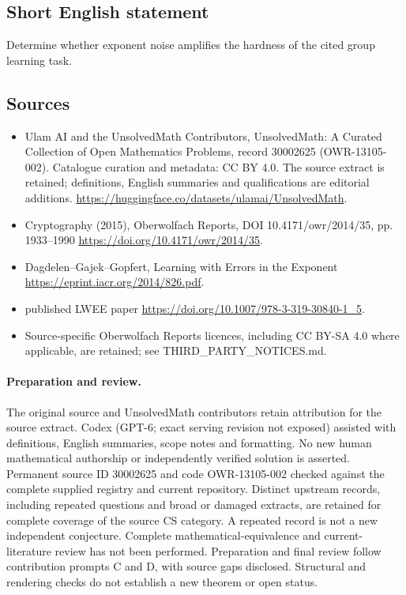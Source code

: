 \documentclass[11pt]{article}
\begin{document}
\subsection{Short English statement}
Determine whether exponent noise amplifies the hardness of the cited group learning task.
\subsection{Sources}
\begin{itemize}
\item[\hypertarget{source:30002625:1}{S1}] Ulam AI and the UnsolvedMath Contributors, UnsolvedMath: A Curated Collection of Open Mathematics Problems, record 30002625 (OWR-13105-002). Catalogue curation and metadata: CC BY 4.0. The source extract is retained; definitions, English summaries and qualifications are editorial additions.
\url{https://huggingface.co/datasets/ulamai/UnsolvedMath}.
\item[\hypertarget{source:30002625:2}{S2}] Cryptography (2015), Oberwolfach Reports, DOI 10.4171/owr/2014/35, pp. 1933--1990
\url{https://doi.org/10.4171/owr/2014/35}.
\item[\hypertarget{source:30002625:3}{S3}] Dagdelen--Gajek--Gopfert, Learning with Errors in the Exponent
\url{https://eprint.iacr.org/2014/826.pdf}.
\item[\hypertarget{source:30002625:4}{S4}] published LWEE paper
\url{https://doi.org/10.1007/978-3-319-30840-1_5}.
\item Source-specific Oberwolfach Reports licences, including CC BY-SA 4.0 where applicable, are retained; see THIRD\_PARTY\_NOTICES.md.
\end{itemize}
\paragraph{Preparation and review.}
The original source and UnsolvedMath contributors retain attribution for the source extract. Codex (GPT-6; exact serving revision not exposed) assisted with definitions, English summaries, scope notes and formatting. No new human mathematical authorship or independently verified solution is asserted. Permanent source ID 30002625 and code OWR-13105-002 checked against the complete supplied registry and current repository. Distinct upstream records, including repeated questions and broad or damaged extracts, are retained for complete coverage of the source CS category. A repeated record is not a new independent conjecture. Complete mathematical-equivalence and current-literature review has not been performed. Preparation and final review follow contribution prompts C and D, with source gaps disclosed. Structural and rendering checks do not establish a new theorem or open status.
\label{end:30002625}
\end{document}
